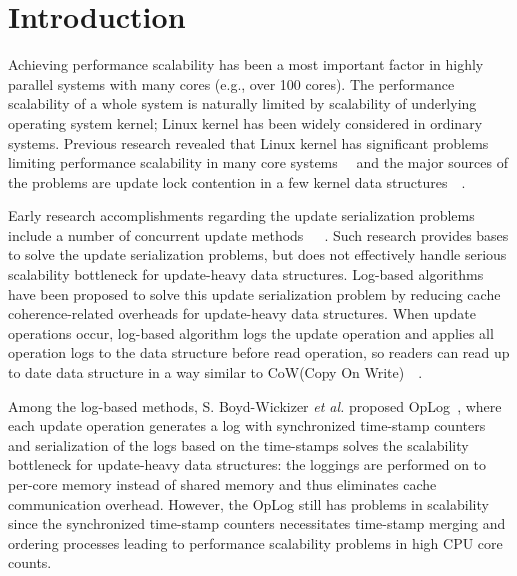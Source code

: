 \section{Introduction} \label{sec:intro}

\ifkor
\else
\fi
Achieving performance scalability has been a most important factor in 
highly parallel systems with many cores (e.g., over 100 cores).
The performance scalability of a whole system is naturally limited by 
scalability of underlying operating system kernel; Linux kernel has been 
widely considered in ordinary systems.
Previous research revealed that Linux kernel has significant problems limiting
performance scalability in many core systems~\cite{SilasBoydWickizer2010LinuxScales48}~\cite{Changwoo2016UMSF}
and the major sources of the problems are update lock contention in a few
kernel data structures~\cite{mckenney2011parallel}~\cite{Matveev2015RLU}.

Early research accomplishments regarding the update serialization problems
include a number of concurrent
update methods~\cite{Arbel2014ConcurrentRCU}~\cite{Matveev2015RLU}~\cite{Dodds2015SCT}.
Such research provides bases to solve the update serialization problems, but
does not effectively handle serious scalability bottleneck for update-heavy data structures.
Log-based algorithms~\cite{Hendler2010FC}~\cite{SilasBoydWickizerPth}
have been proposed to solve this update serialization problem by reducing cache coherence-related
overheads for update-heavy data structures.
When update operations occur, log-based algorithm logs the update
operation and applies all operation logs to the data structure
before read operation, so readers can read up to date data structure in a way
similar to CoW(Copy On Write)~\cite{PaulDetailLWN}~\cite{Morrison2016SSM}.

Among the log-based methods,
S. Boyd-Wickizer \textit{et al.} proposed OpLog~\cite{SilasBoydWickizerPth}, where 
each update operation generates a log with synchronized time-stamp counters
and serialization of the logs based on the time-stamps solves the scalability
bottleneck for update-heavy data structures: 
the loggings are performed on to per-core memory instead of shared memory and
thus eliminates cache communication overhead.
However, the OpLog still has problems in scalability since the synchronized time-stamp
counters necessitates time-stamp merging and ordering processes leading to 
performance scalability problems in high CPU core counts.

